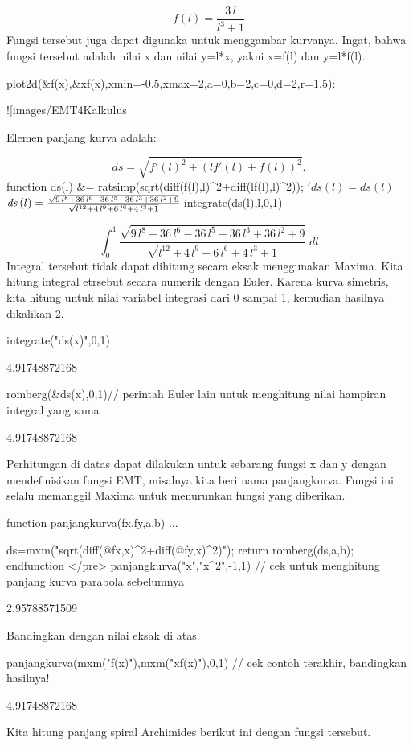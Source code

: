 \documentclass{article}
\begin{document}
$$f\left(l\right)=\frac{3\,l}{l^3+1}$$Fungsi tersebut juga dapat digunaka untuk menggambar kurvanya. Ingat, bahwa fungsi tersebut adalah nilai x dan nilai y=l*x, yakni
x=f(l) dan y=l*f(l).


\>plot2d(&f(x),&x\*f(x),xmin=-0.5,xmax=2,a=0,b=2,c=0,d=2,r=1.5):


![images/EMT4Kalkulus%

Elemen panjang kurva adalah:


$$ds=\sqrt{f'(l)^2+(lf'(l)+f(l))^2}.$$\>function ds(l) &= ratsimp(sqrt(diff(f(l),l)^2+diff(l\*f(l),l)^2)); $'ds(l)=ds(l)


$${\it ds}\left(l\right)=\frac{\sqrt{9\,l^8+36\,l^6-36\,l^5-36\,l^3+
 36\,l^2+9}}{\sqrt{l^{12}+4\,l^9+6\,l^6+4\,l^3+1}}$$\>$integrate(ds(l),l,0,1)


$$\int_{0}^{1}{\frac{\sqrt{9\,l^8+36\,l^6-36\,l^5-36\,l^3+36\,l^2+9}
 }{\sqrt{l^{12}+4\,l^9+6\,l^6+4\,l^3+1}}\;dl}$$Integral tersebut tidak dapat dihitung secara eksak menggunakan Maxima. Kita hitung integral etrsebut secara numerik dengan Euler.
Karena kurva simetris, kita hitung untuk nilai variabel integrasi dari 0 sampai 1, kemudian hasilnya dikalikan 2. 


\*integrate("ds(x)",0,1)


    4.91748872168

\*romberg(&ds(x),0,1)// perintah Euler lain untuk menghitung nilai hampiran integral yang sama


    4.91748872168

Perhitungan di datas dapat dilakukan untuk sebarang fungsi x dan y dengan mendefinisikan fungsi EMT, misalnya kita beri nama
panjangkurva. Fungsi ini selalu memanggil Maxima untuk menurunkan fungsi yang diberikan.


\>function panjangkurva(fx,fy,a,b) ...


    ds=mxm("sqrt(diff(@fx,x)^2+diff(@fy,x)^2)");
    return romberg(ds,a,b);
    endfunction
</pre>
\>panjangkurva("x","x^2",-1,1) // cek untuk menghitung panjang kurva parabola sebelumnya


    2.95788571509

Bandingkan dengan nilai eksak di atas.


\*panjangkurva(mxm("f(x)"),mxm("x\*f(x)"),0,1) // cek contoh terakhir, bandingkan hasilnya!


    4.91748872168

Kita hitung panjang spiral Archimides berikut ini dengan fungsi tersebut.
\end{document}
